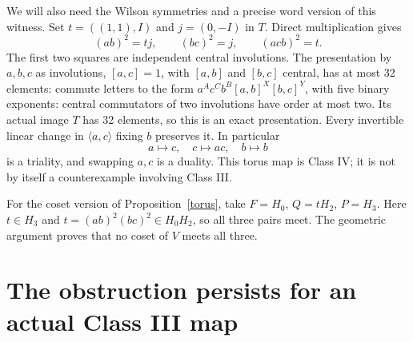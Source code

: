 \documentclass[11pt,a4paper]{article}
\newcommand{\gen}[1]{\langle#1\rangle}\newcommand{\F}{\mathbb F}\newcommand{\Aut}{\operatorname{Aut}}
\begin{document}
We will also need the Wilson symmetries and a precise word version
of this witness. Set $t=((1,1),I)$ and $j=(0,-I)$ in $T$. Direct
multiplication gives
\begin{equation}\label{words}
 (ab)^2=tj,\qquad (bc)^2=j,\qquad (acb)^2=t.
\end{equation}
The first two squares are independent central involutions. The
presentation by $a,b,c$ as involutions, $[a,c]=1$, with
$[a,b]$ and $[b,c]$ central, has at most 32 elements: commute
letters to the form $a^A c^C b^B[a,b]^X[b,c]^Y$, with five binary
exponents: central commutators of two involutions have order at most
two. Its actual image $T$ has 32 elements, so this is an
exact presentation. Every invertible linear change in $\gen{a,c}$
fixing $b$ preserves it. In particular
\[
 a\mapsto c,\quad c\mapsto ac,\quad b\mapsto b
\]
is a triality, and swapping $a,c$ is a duality. This torus map is
Class IV; it is not by itself a counterexample involving Class III.

For the coset version of Proposition~\ref{torus}, take
$F=H_0$, $Q=tH_2$, $P=H_3$. Here $t\in H_3$ and
$t=(ab)^2(bc)^2\in H_0H_2$, so all three pairs meet.
The geometric argument proves that no coset of $V$ meets all three.

\section{The obstruction persists for an actual Class III map}
\end{document}
